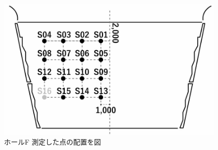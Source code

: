 \documentclass[11pt,a4j]{jreport}
\begin{document}
\begin{figure}[H]
\begin{minipage}{0.5\textwidth}
      \includegraphics[width=.8\linewidth]{images/measuredHalls/resized/flat_f.jpg}
      \\ホールF 測定した点の配置を図
    \end{minipage}%
    \begin{minipage}{.5\linewidth} %
        \raggedleft

\end{minipage}
\end{figure}
\end{document}
